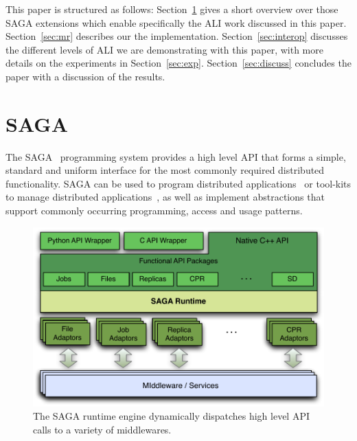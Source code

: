 \documentclass[3p,twocolumn]{elsarticle}
\begin{document}

This paper is structured as follows: Section~\ref{sec:saga} gives
a short overview over those SAGA extensions which enable specifically
the ALI work discussed in this paper.  Section~\ref{sec:mr} describes
our the \smr implementation.  Section~\ref{sec:interop} discusses the
different levels of ALI we are demonstrating with this paper, with more
details on the experiments in Section~\ref{sec:exp}.
Section~\ref{sec:discuss} concludes the paper with a discussion of the
results.








\section{SAGA}
\label{sec:saga}

The SAGA~\cite{saga-core, Kaiser:2006qp} programming system provides a
high level API that forms a simple, standard and uniform interface for
the most commonly required distributed functionality.  SAGA can be
used to program distributed applications~\cite{saga_escience07,
saga_tg08} or tool-kits to manage distributed
applications~\cite{Luckow:2008xy}, as well as implement abstractions
that support commonly occurring programming, access and usage
patterns.

\begin{figure}[t]
 \includegraphics[scale=0.5]{saga-figure02.pdf}
 \caption{The SAGA runtime engine dynamically dispatches high level
          API calls to a variety of middlewares.}
 \label{fig:saga}
\end{figure}
\end{document}
